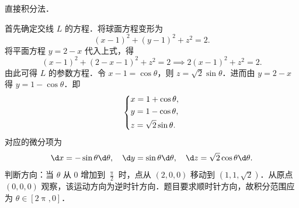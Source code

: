 \begin{solution}
    直接积分法．

    首先确定交线 $L$ 的方程．将球面方程变形为
    \begin{equation}
        (x-1)^2 + (y-1)^2 + z^2 = 2.
    \end{equation}
    将平面方程 $y = 2 - x$ 代入上式，得
    \begin{equation}
        (x-1)^2 + (2-x-1)^2 + z^2 = 2 \implies 2(x-1)^2 + z^2 = 2.
    \end{equation}
    由此可得 $L$ 的参数方程．令 $x - 1 = \cos \theta$，则 $z = \sqrt{2} \sin \theta$．进而由 $y = 2 - x$ 得 $y = 1 - \cos \theta$．即
    \begin{equation}
        \begin{dcases}
            x = 1 + \cos \theta, \\
            y = 1 - \cos \theta, \\
            z = \sqrt{2} \sin \theta.
        \end{dcases}
    \end{equation}
    对应的微分项为
    \begin{equation}
        \d x = -\sin \theta \d \theta, \quad \d y = \sin \theta \d \theta, \quad \d z = \sqrt{2} \cos \theta \d \theta.
    \end{equation}
    判断方向：当 $\theta$ 从 $0$ 增加到 $\frac{\uppi}{2}$ 时，点从 $(2,0,0)$ 移动到 $(1,1,\sqrt{2})$．从原点 $(0,0,0)$ 观察，该运动方向为逆时针方向．题目要求顺时针方向，故积分范围应为 $\theta \in [2\uppi, 0]$．


\end{solution}
